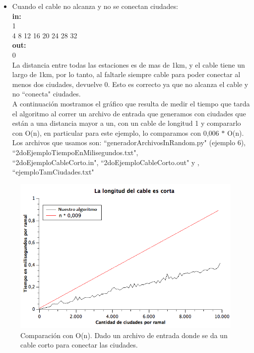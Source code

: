 \begin{itemize}
\item Cuando el cable no alcanza y no se conectan ciudades:\\
\textbf{in:}\\ 
1\\
4 8 12 16 20 24 28 32 \\
\textbf{out:}\\
0\\

La distancia entre todas las estaciones es de mas de 1km, y el cable tiene un largo de 1km, por lo tanto, al faltarle siempre cable para poder conectar al menos dos ciudades, devuelve 0. Esto es correcto ya que no alcanza el cable y no ``conecta" ciudades. \\

A continuación mostramos el gráfico que resulta de medir el tiempo que tarda el algoritmo al correr un archivo de entrada que generamos con ciudades que están a una distancia mayor a un, con un cable de longitud 1 y compararlo con O(n), en particular para este ejemplo, lo comparamos con 0,006 $*$ O(n). Los archivos que usamos son: ``generadorArchivosInRandom.py" (ejemplo 6), ``2doEjemploTiempoEnMilisegundos.txt", \\ ``2doEjemploCableCorto.in", ``2doEjemploCableCorto.out" y , ``ejemploTamCiudades.txt"\\

\end{itemize}

\begin{figure}[H]
\begin{center}

  \includegraphics[width=\linewidth]{../graficos/ej1/CableCorto.png}
  \caption{{\small Comparación con O(n). Dado un archivo de entrada donde se da un cable corto para conectar las ciudades.}} \label{ej1-tiempo-vs-falta-1-km-siempre}
\endminipage

\end{center}
\end{figure}


